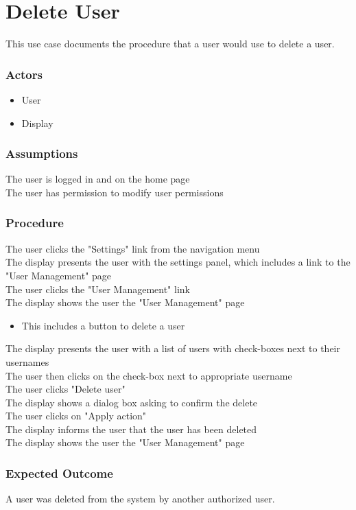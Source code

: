 \section{Delete User}

This use case documents the procedure that a user would use to delete a user.

\subsubsection{Actors}
\begin{itemize}
	\item User
	\item Display
\end{itemize}

\subsubsection{Assumptions}

The user is logged in and on the home page\\
The user has permission to modify user permissions

\subsubsection{Procedure}

The user clicks the "Settings" link from the navigation menu\\
The display presents the user with the settings panel, which includes a link to the "User Management" page\\
The user clicks the "User Management" link\\
The display shows the user the "User Management" page
\begin{itemize}
	\item This includes a button to delete a user
\end{itemize}
The display presents the user with a list of users with check-boxes next to their usernames\\
The user then clicks on the check-box next to appropriate username\\
The user clicks "Delete user" \\
The display shows a dialog box asking to confirm the delete\\
The user clicks on "Apply action" \\
The display informs the user that the user has been deleted\\
The display shows the user the "User Management" page\\

\subsubsection{Expected Outcome}

A user was deleted from the system by another authorized user.